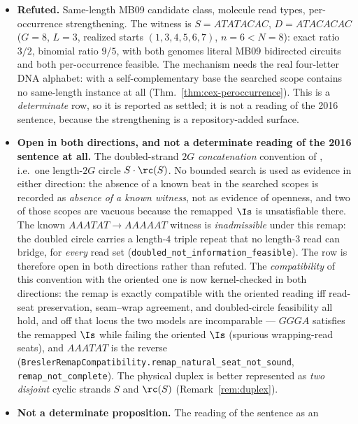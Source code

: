 \begin{remark}
\begin{itemize}
  \item \textbf{Refuted.} Same-length MB09 candidate class, molecule read types,
    per-occurrence strengthening. The witness is $S=ATATACAC$, $D=ATACACAC$
    ($G=8$, $L=3$, realized starts $(1,3,4,5,6,7)$, $n=6<N=8$): exact ratio
    $3/2$, binomial ratio $9/5$, with both genomes literal MB09 bidirected
    circuits and both per-occurrence feasible. The mechanism needs the real
    four-letter DNA alphabet: with a self-complementary base the searched scope
    contains no same-length instance at all
    (Thm.~\ref{thm:cex-peroccurrence}). This is a \emph{determinate} row, so it
    is reported as settled; it is not a reading of the 2016 sentence, because the
    strengthening is a repository-added surface.
  \item \textbf{Open in both directions, and not a determinate reading of the
    2016 sentence at all.} The doubled-strand $2G$ \emph{concatenation}
    convention of \parencite{bresler2013}, i.e.\ one length-$2G$ circle
    $S\cdot\rc(S)$. No bounded search is used as evidence in either direction:
    the absence of a known beat in the searched scopes is recorded as
    \emph{absence of a known witness}, not as evidence of openness, and two of
    those scopes are vacuous because the remapped $\Is$ is unsatisfiable there.
    The known $AAATAT\to AAAAAT$ witness is \emph{inadmissible} under this
    remap: the doubled circle carries a length-$4$ triple repeat that no
    length-$3$ read can bridge, for \emph{every} read set
     (\texttt{doubled\_\allowbreak{}not\_\allowbreak{}information\_\allowbreak{}feasible}). The row is therefore open in
     both directions rather than refuted. The \emph{compatibility} of this
     convention with the oriented one is now kernel-checked in both directions:
     the remap is exactly compatible with the oriented reading iff read-seat
     preservation, seam--wrap agreement, and doubled-circle feasibility all hold,
     and off that locus the two models are incomparable --- $GGGA$ satisfies the
     remapped $\Is$ while failing the oriented $\Is$ (spurious wrapping-read
     seats), and $AAATAT$ is the reverse
     (\texttt{Bresler\allowbreak{}Remap\allowbreak{}Compatibility.\allowbreak{}remap\_\allowbreak{}natural\_\allowbreak{}seat\_\allowbreak{}not\_\allowbreak{}sound},
     \texttt{remap\_\allowbreak{}not\_\allowbreak{}complete}). The physical duplex is better
     represented as \emph{two disjoint} cyclic strands $S$ and $\rc(S)$
     (Remark~\ref{rem:duplex}).
  \item \textbf{Not a determinate proposition.} The reading of the sentence as an

\end{itemize}
\end{remark}
